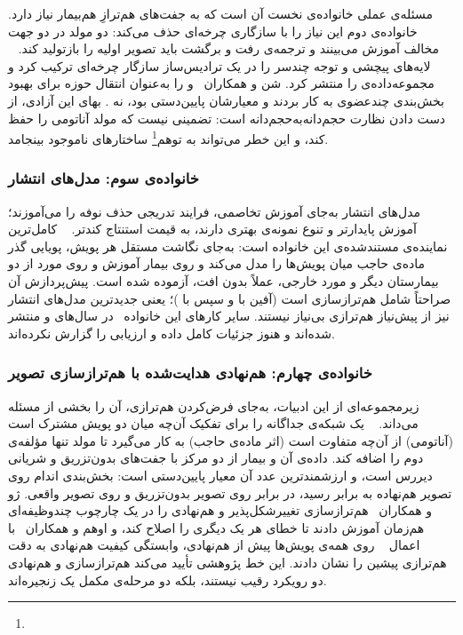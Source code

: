 مسئله‌ی عملی خانواده‌ی نخست آن است که به جفت‌های هم‌ترازِ هم‌بیمار نیاز دارد. خانواده‌ی دوم این نیاز را با سازگاری چرخه‌ای حذف می‌کند: دو مولد در دو جهت مخالف آموزش می‌بینند و ترجمه‌ی رفت و برگشت باید تصویر اولیه را بازتولید کند. ~\cite{Ris21} لایه‌های پیچشی و توجه چندسر را در یک ترادیس‌ساز سازگار چرخه‌ای ترکیب کرد و مجموعه‌داده‌ی  را منتشر کرد. شن و همکاران~\cite{Shen21}  و  را به‌عنوان انتقال حوزه برای بهبود بخش‌بندی چندعضوی به کار بردند و معیارشان  پایین‌دستی بود، نه . بهای این آزادی، از دست دادن نظارت حجم‌دانه‌به‌حجم‌دانه است: تضمینی نیست که مولد آناتومی را حفظ کند، و این خطر می‌تواند به توهم\footnote{} ساختارهای ناموجود بینجامد.

\subsubsection*{خانواده‌ی سوم: مدل‌های انتشار}

مدل‌های انتشار به‌جای آموزش تخاصمی، فرایند تدریجی حذف نوفه را می‌آموزند؛ آموزش پایدارتر و تنوع نمونه‌ی بهتری دارند، به قیمت استنتاج کندتر. ~\cite{Zhe25} کامل‌ترین نماینده‌ی مستندشده‌ی این خانواده است: به‌جای نگاشت مستقل هر پویش، پویایی گذر ماده‌ی حاجب میان پویش‌ها را مدل می‌کند و روی  بیمار آموزش و روی  مورد از دو بیمارستان دیگر و  مورد خارجی، عملاً بدون افت، آزموده شده است. پیش‌پردازش آن صراحتاً شامل هم‌ترازسازی است (آفین با  و سپس  با )؛ یعنی جدیدترین مدل‌های انتشار نیز از پیش‌نیاز هم‌ترازی بی‌نیاز نیستند. سایر کارهای این خانواده~\cite{Zhu25,Wan25b,Zhu25b,Li26} در سال‌های  و  منتشر شده‌اند و هنوز جزئیات کامل داده و ارزیابی را گزارش نکرده‌اند.

\subsubsection*{خانواده‌ی چهارم: هم‌نهادی هدایت‌شده با هم‌ترازسازی تصویر}

زیرمجموعه‌ای از این ادبیات، به‌جای فرض‌کردن هم‌ترازی، آن را بخشی از مسئله می‌داند. ~\cite{Zho24} یک شبکه‌ی جداگانه را برای تفکیک آن‌چه میان دو پویش مشترک است (آناتومی) از آن‌چه متفاوت است (اثر ماده‌ی حاجب) به کار می‌گیرد تا مولد تنها مؤلفه‌ی دوم را اضافه کند. داده‌ی آن  و  بیمار از دو مرکز با جفت‌های بدون‌تزریق و شریانی دیررس است، و ارزشمندترین عدد آن معیار پایین‌دستی است: بخش‌بندی  اندام روی تصویر هم‌نهاده به  برابر  رسید، در برابر  روی تصویر بدون‌تزریق و  روی تصویر واقعی. ژو و همکاران~\cite{Zho23} هم‌ترازسازی تغییرشکل‌پذیر و هم‌نهادی را در یک چارچوب چندوظیفه‌ای هم‌زمان آموزش دادند تا خطای هر یک دیگری را اصلاح کند، و اوهم و همکاران~\cite{Uhm22} با اعمال ~\cite{heinrich2013} روی همه‌ی پویش‌ها پیش از هم‌نهادی، وابستگی کیفیت هم‌نهادی به دقت هم‌ترازی پیشین را نشان دادند. این خط پژوهشی تأیید می‌کند هم‌ترازسازی و هم‌نهادی دو رویکرد رقیب نیستند، بلکه دو مرحله‌ی مکمل یک زنجیره‌اند.

